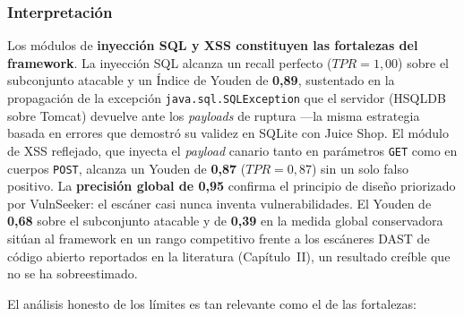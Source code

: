 \documentclass[12pt, a4paper]{article}
\begin{document}
\subsubsection{Interpretación}

Los módulos de \textbf{inyección SQL y XSS constituyen las fortalezas del
framework}. La inyección SQL alcanza un recall perfecto ($TPR = 1{,}00$) sobre el
subconjunto atacable y un Índice de Youden de \textbf{0,89}, sustentado en la
propagación de la excepción \texttt{java.sql.SQLException} que el servidor (HSQLDB
sobre Tomcat) devuelve ante los \textit{payloads} de ruptura ---la misma estrategia
basada en errores que demostró su validez en SQLite con Juice Shop. El módulo de
XSS reflejado, que inyecta el \textit{payload} canario tanto en parámetros
\texttt{GET} como en cuerpos \texttt{POST}, alcanza un Youden de \textbf{0,87}
($TPR = 0{,}87$) sin un solo falso positivo. La \textbf{precisión global de 0,95}
confirma el principio de diseño priorizado por VulnSeeker: el escáner casi nunca
inventa vulnerabilidades. El Youden de \textbf{0,68} sobre el subconjunto atacable
y de \textbf{0,39} en la medida global conservadora sitúan al framework en un rango
competitivo frente a los escáneres DAST de código abierto reportados en la
literatura (Capítulo~II), un resultado creíble que no se ha sobreestimado.

El análisis honesto de los límites es tan relevante como el de las fortalezas:
\end{document}
